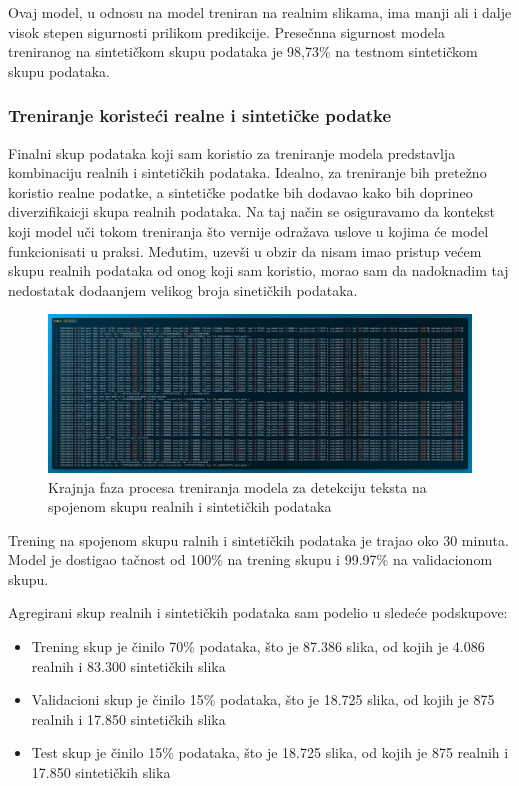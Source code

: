 \documentclass[a4paper,12pt]{article}
\begin{document}
	Ovaj model, u odnosu na model treniran na realnim slikama, ima manji ali i dalje visok stepen sigurnosti prilikom predikcije. Presečnna sigurnost modela treniranog na sintetičkom skupu podataka je 98,73\% na testnom sintetičkom skupu podataka.
	
	\subsubsection{Treniranje koristeći realne i sintetičke podatke}
	Finalni skup podataka koji sam koristio za treniranje modela predstavlja kombinaciju realnih i sintetičkih podataka. Idealno, za treniranje bih pretežno koristio realne podatke, a sintetičke podatke bih dodavao kako bih doprineo diverzifikaicji skupa realnih podataka. Na taj način se osiguravamo da kontekst koji model uči tokom treniranja što vernije odražava uslove u kojima će model funkcionisati u praksi. Međutim, uzevši u obzir da nisam imao pristup većem skupu realnih podataka od onog koji sam koristio, morao sam da nadoknadim taj nedostatak dodaanjem velikog broja sinetičkih podataka.
	
	\begin{figure}[H]
		\centering
		\includegraphics[width=\textwidth]{assets/train-code-real-and-synthetic-data.png}
		\caption{Krajnja faza procesa treniranja modela za detekciju teksta na spojenom skupu realnih i sintetičkih podataka}
		\label{fig:train-code-real-and-synthetic-data}
	\end{figure}
	
	Trening na spojenom skupu ralnih i sintetičkih podataka je trajao oko 30 minuta. Model je dostigao tačnost od 100\% na trening skupu i 99.97\% na validacionom skupu.\newline
	
	Agregirani skup realnih i sintetičkih podataka sam podelio u sledeće podskupove:
	\begin{itemize}
		\item Trening skup je činilo 70\% podataka, što je 87.386 slika, od kojih je 4.086 realnih i 83.300 sintetičkih slika
		\item Validacioni skup je činilo 15\% podataka, što je 18.725 slika, od kojih je 875 realnih i 17.850 sintetičkih slika
		\item Test skup je činilo 15\% podataka, što je 18.725 slika, od kojih je 875 realnih i 17.850 sintetičkih slika
	\end{itemize}
\end{document}
